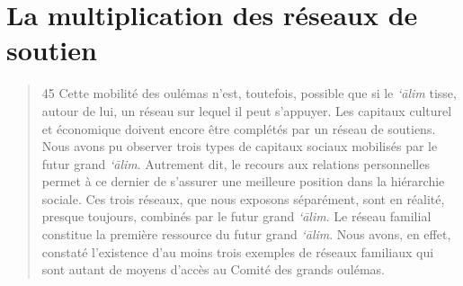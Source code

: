 \hypertarget{la-multiplication-des-ruxe9seaux-de-soutien}{%
\section{La multiplication des réseaux de
soutien}\label{la-multiplication-des-ruxe9seaux-de-soutien}}

\begin{quote}
45 Cette mobilité des oulémas n'est, toutefois, possible que si le
\emph{`ālim} tisse, autour de lui, un réseau sur lequel il peut
s'appuyer. Les capitaux culturel et économique doivent encore être
complétés par un réseau de soutiens. Nous avons pu observer trois types
de capitaux sociaux mobilisés par le futur grand \emph{`ālim}. Autrement
dit, le recours aux relations personnelles permet à ce dernier de
s'assurer une meilleure position dans la hiérarchie sociale. Ces trois
réseaux, que nous exposons séparément, sont en réalité, presque
toujours, combinés par le futur grand \emph{`ālim}. Le réseau familial
constitue la première ressource du futur grand \emph{`ālim}. Nous avons,
en effet, constaté l'existence d'au moins trois exemples de réseaux
familiaux qui sont autant de moyens d'accès au Comité des grands
oulémas.


\end{quote}
